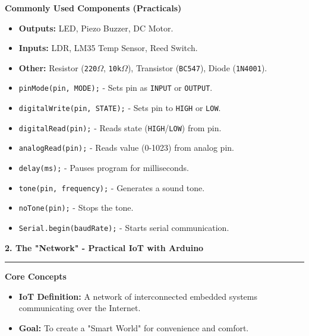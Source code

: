 \documentclass[a4paper, 8pt]{extarticle}
\newcommand{\sectionheading}[1]{\large\textbf{#1}\par\noindent\rule{\linewidth}{0.4pt}}
\newcommand{\subsectionheading}[1]{\normalsize\textbf{#1}}
\begin{document}
\begin{multicols}{2}
\subsectionheading{Commonly Used Components (Practicals)}
\begin{itemize}
    \item \textbf{Outputs:} LED, Piezo Buzzer, DC Motor.
    \item \textbf{Inputs:} LDR, LM35 Temp Sensor, Reed Switch.
    \item \textbf{Other:} Resistor (\texttt{220$\Omega$}, \texttt{10k$\Omega$}), Transistor (\texttt{BC547}), Diode (\texttt{1N4001}).
\end{itemize}

\begin{tcolorbox}[title=\textbf{Core Arduino Functions}]
    \begin{itemize}
        \item \texttt{pinMode(pin, MODE);} - Sets pin as \texttt{INPUT} or \texttt{OUTPUT}.
        \item \texttt{digitalWrite(pin, STATE);} - Sets pin to \texttt{HIGH} or \texttt{LOW}.
        \item \texttt{digitalRead(pin);} - Reads state (\texttt{HIGH}/\texttt{LOW}) from pin.
        \item \texttt{analogRead(pin);} - Reads value (0-1023) from analog pin.
        \item \texttt{delay(ms);} - Pauses program for milliseconds.
        \item \texttt{tone(pin, frequency);} - Generates a sound tone.
        \item \texttt{noTone(pin);} - Stops the tone.
        \item \texttt{Serial.begin(baudRate);} - Starts serial communication.
    \end{itemize}
\end{tcolorbox}


\columnbreak %


\sectionheading{2. The "Network" - Practical IoT with Arduino}
\vspace{0.5em}
\subsectionheading{Core Concepts}
\begin{itemize}
    \item \textbf{IoT Definition:} A network of interconnected embedded systems communicating over the Internet.
    \item \textbf{Goal:} To create a "Smart World" for convenience and comfort.
\end{itemize}


\end{multicols}
\end{document}
